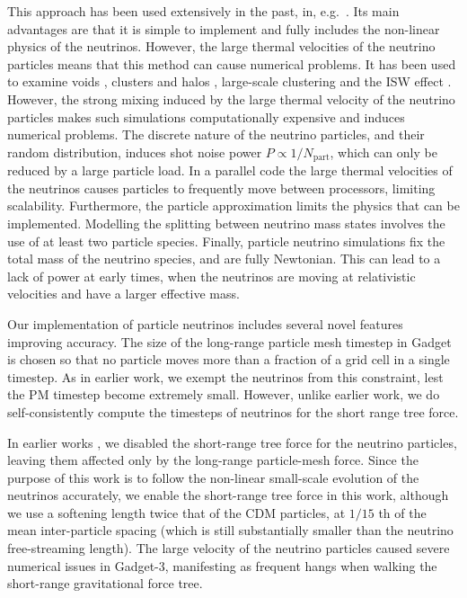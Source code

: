 \documentclass[useAMS, usenatbib]{mnras}
\begin{document}
This approach has been used extensively in the past, in, e.g.~\citep{Brandbyge_2008, Bird_2012, Inman_2017, FVN_2017}. Its main advantages are that it is simple to implement and fully includes the non-linear physics of the neutrinos. However, the large thermal velocities of the neutrino particles means that this method can cause numerical problems. It has been used to examine voids \citep{Massara_2015}, clusters and halos \citep{FVN_2014, Castorina_2014, Costanzi_2013}, large-scale clustering \citep{Castorina_2015} and the ISW effect \citep{Carbone_2016}. However, the strong mixing induced by the large thermal velocity of the neutrino particles makes such simulations computationally expensive and induces numerical problems.
The discrete nature of the neutrino particles, and their random distribution, induces shot noise power $P \propto 1/N_\mathrm{part}$, which can only be reduced by a large particle load. In a parallel code the large thermal velocities of the neutrinos causes particles to frequently move between processors, limiting scalability. Furthermore, the particle approximation limits the physics that can be implemented. Modelling the splitting between neutrino mass states involves the use of at least two particle species. Finally, particle neutrino simulations fix the total mass of the neutrino species, and are fully Newtonian. This can lead to a lack of power at early times, when the neutrinos are moving at relativistic velocities and have a larger effective mass.

Our implementation of particle neutrinos includes several novel features improving accuracy. The size of the long-range particle mesh timestep in Gadget is chosen so that no particle moves more than a fraction of a grid cell in a single timestep. As in earlier work, we exempt the neutrinos from this constraint, lest the PM timestep become extremely small. However, unlike earlier work, we do self-consistently compute the timesteps of neutrinos for the short range tree force. 

In earlier works \citep{Bird_2012}, we disabled the short-range tree force for the neutrino particles, leaving them affected only by the long-range particle-mesh force. Since the purpose of this work is to follow the non-linear small-scale evolution of the neutrinos accurately, we enable the short-range tree force in this work, although we use a softening length
twice that of the CDM particles, at $1/15$ th of the mean inter-particle spacing (which is still substantially smaller than the neutrino free-streaming length). The large velocity of the neutrino particles caused severe numerical issues in Gadget-3, manifesting as frequent hangs when walking the short-range gravitational force tree. 
\end{document}
